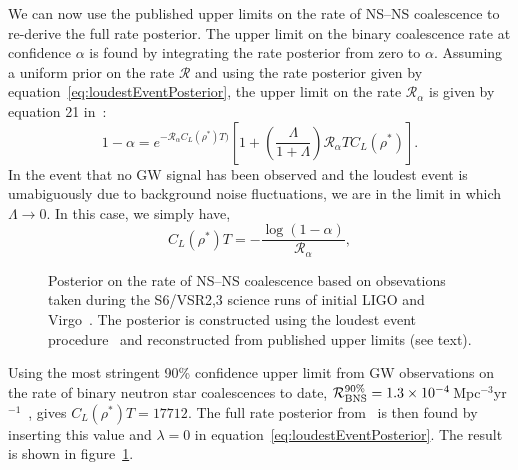 \documentclass[twocolumn,nofootinbib]{revtex4-1}
\newcommand{\cbcrate}{{{\mathcal R}}}
\newcommand{\rhostar}{{\rho^*}}
\newcommand{\BNS}{\ac{NS}--\ac{NS}\xspace}
\begin{document}
We can now use the published upper limits on the rate of \BNS coalescence to re-derive the full rate posterior.
The upper limit on the binary coalescence rate at confidence $\alpha$ is found by integrating the rate posterior from zero to $\alpha$.
Assuming a uniform prior on the rate $\cbcrate$ and using the rate posterior given by equation~\ref{eq:loudestEventPosterior}, the upper limit on the rate $\cbcrate_{\alpha}$ is given by equation 21 in~\cite{BradyFairhurst08}:
%
\begin{equation}
1-\alpha =  e^{-\cbcrate_{\alpha} C_L(\rhostar)T)}
\left[ 
1+ \left(\frac{\Lambda}{1+\Lambda}\right) \cbcrate_{\alpha} T C_L(\rhostar)
\right ].
\label{eq:rateIntegral}
\end{equation}
%
In the event that no \ac{GW} signal has been observed and the loudest event is umabiguously due to background noise fluctuations, we are in the limit in which $\Lambda \rightarrow 0$.
In this case, we simply have,
\begin{equation}
C_L(\rhostar)T = -\frac{\log(1-\alpha)}{\cbcrate_{\alpha}},
\end{equation}
%
%

\begin{figure}
\centering
\caption{Posterior on the rate of \BNS coalescence based on obsevations taken during the S6/VSR2,3 science runs of initial LIGO and Virgo~\cite{Colaboration:2011np}.
    The posterior is constructed using the loudest event procedure~\cite{Biswas09,BradyFairhurst08} and reconstructed from published upper limits (see text).
    \label{fig:s6rate}}
\end{figure}

Using the most stringent 90\% confidence upper limit from \ac{GW} observations on the rate of binary neutron star coalescences to date, $\cbcrate^{90\%}_{{\rm BNS}} = 1.3\times 10^{-4}$\,Mpc$^{-3}$yr$^{-1}$~\cite{Colaboration:2011np}, gives $C_L(\rhostar)T=17712$.
The full rate posterior from~\cite{Colaboration:2011np} is then found by inserting this value and $\lambda=0$ in equation~\ref{eq:loudestEventPosterior}.
The result is shown in figure~\ref{fig:s6rate}.
\end{document}

